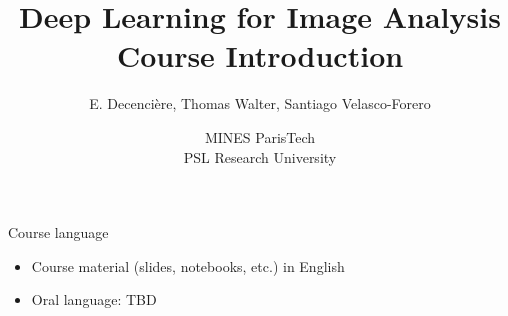 \documentclass[xcolor=pdftex,dvipsnames,table,mathserif]{beamer}
\title{Deep Learning for Image Analysis\\Course Introduction}
\author{E. Decencière, Thomas Walter, Santiago Velasco-Forero}
\date{MINES ParisTech\\
  PSL Research University
}
\begin{document}
\begin{frame}
\titlepage
\end{frame}


\begin{frame}{Course language}

\begin{itemize}
\item Course material (slides, notebooks, etc.) in English
\item Oral language: TBD
\end{itemize}

\end{frame}



\end{document}
